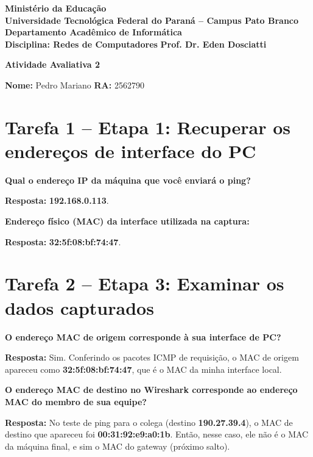 \documentclass[12pt,a4paper]{article}
\newcommand{\resposta}[1]{\textbf{Resposta:} #1}
\begin{document}
\begin{center}
\textbf{Ministério da Educação}\\
\textbf{Universidade Tecnológica Federal do Paraná -- Campus Pato Branco}\\
\textbf{Departamento Acadêmico de Informática}\\[0.5em]
\textbf{Disciplina: Redes de Computadores} \hfill \textbf{Prof. Dr. Eden Dosciatti}

\vspace{1.2em}
\Large\textbf{Atividade Avaliativa 2}
\end{center}

\vspace{1em}
\noindent\textbf{Nome:} Pedro Mariano \hfill \textbf{RA:} 2562790

\vspace{1em}
\section*{Tarefa 1 -- Etapa 1: Recuperar os endereços de interface do PC}

\noindent\textbf{Qual o endereço IP da máquina que você enviará o ping?}

\resposta{\textbf{192.168.0.113}.}

\vspace{0.7em}
\noindent\textbf{Endereço físico (MAC) da interface utilizada na captura:}

\resposta{\textbf{32:5f:08:bf:74:47}.}

\section*{Tarefa 2 -- Etapa 3: Examinar os dados capturados}

\noindent\textbf{O endereço MAC de origem corresponde à sua interface de PC?}

\resposta{Sim. Conferindo os pacotes ICMP de requisição, o MAC de origem apareceu como \textbf{32:5f:08:bf:74:47}, que é o MAC da minha interface local.}

\vspace{0.7em}
\noindent\textbf{O endereço MAC de destino no Wireshark corresponde ao endereço MAC do membro de sua equipe?}

\resposta{No teste de ping para o colega (destino \textbf{190.27.39.4}), o MAC de destino que apareceu foi \textbf{00:31:92:e9:a0:1b}. Então, nesse caso, ele não é o MAC da máquina final, e sim o MAC do gateway (próximo salto).}
\end{document}
